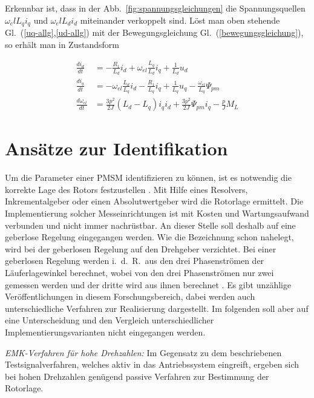 \documentclass[conference,twocolumn]{IEEEtran}
\begin{document}
Erkennbar ist, dass in der Abb.~\ref{fig:spannungsgleichungen} die Spannungsquellen $\omega_el L_q i_q$ und $\omega_el L_d i_d$ miteinander verkoppelt sind.
Löst man oben stehende Gl.~(\ref{uq-allg},\ref{ud-allg}) mit der Bewegungsgleichung Gl.~(\ref{bewegungsgleichung}), so erhält man in Zustandsform

\begin{align}
\frac{di_d}{dt} &= -\frac{R_1}{L_d}i_d+\omega_{el}\frac{L_q}{L_d}i_q+\frac{1}{L_d}u_d \\
\frac{di_q}{dt} &= -\omega_{el}\frac{L_d}{L_q}i_d - \frac{R_1}{L_q}i_q + \frac{1}{L_q}u_q-\frac{\omega_{el}}{L_q}\Psi_{pm} \\
\frac{d\omega_{el}}{dt} &= \frac{3p^2}{2J}(L_d - L_q)i_q i_d + \frac{3p^2}{2J} \Psi_{pm} i_q - \frac{p}{J} M_L
\end{align}

\section{Ansätze zur Identifikation}\label{sec:identifikation}

Um die Parameter einer PMSM identifizieren zu können, ist es notwendig die korrekte Lage des Rotors festzustellen \autocites{underwood_online_2010}{rahman_identification_2005}{piippo_adaptation_2009}.
Mit Hilfe eines Resolvers, Inkrementalgeber oder einen Absolutwertgeber wird die Rotorlage ermittelt.
Die Implementierung solcher Messeinrichtungen ist mit Kosten und Wartungsaufwand verbunden und nicht immer nachrüstbar.
An dieser Stelle soll deshalb auf eine geberlose Regelung eingegangen werden.
Wie die Bezeichnung schon nahelegt, wird bei der geberlosen Regelung auf den Drehgeber verzichtet.
Bei einer geberlosen Regelung werden i.\ d.\ R.\ aus den drei Phasenströmen der Läuferlagewinkel berechnet, wobei von den drei Phasenströmen nur zwei gemessen werden und der dritte wird aus ihnen berechnet \autocite{slotine_applied_1991}.
Es gibt unzählige Veröffentlichungen in diesem Forschungsbereich, dabei werden auch unterschiedliche Verfahren zur Realisierung dargestellt.
Im folgenden soll aber auf eine Unterscheidung und den Vergleich unterschiedlicher Implementierungsvarianten nicht eingegangen werden.


\emph{EMK-Verfahren für hohe Drehzahlen:} Im Gegensatz zu dem beschriebenen Testsignalverfahren, welches aktiv in das Antriebssystem eingreift, ergeben sich bei hohen Drehzahlen genügend passive Verfahren zur Bestimmung der Rotorlage.
\end{document}
